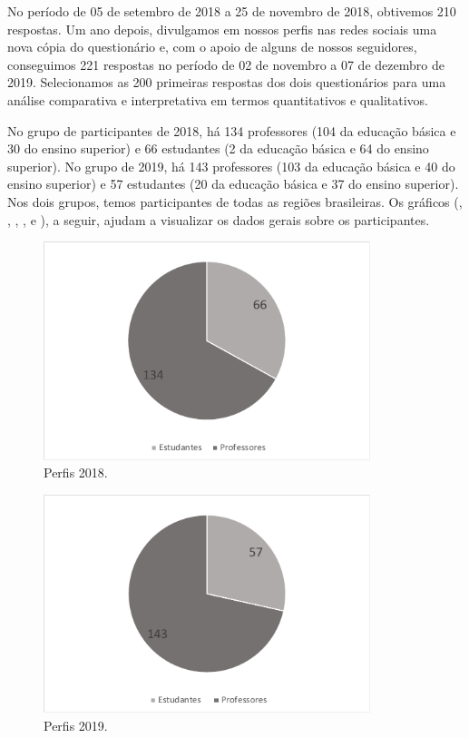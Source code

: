 \documentclass[portuguese]{textolivre}
\begin{document}
No período de 05 de setembro de 2018 a 25 de novembro de 2018, obtivemos 210 respostas. Um ano depois, divulgamos em nossos perfis nas redes sociais uma nova cópia do questionário e, com o apoio de alguns de nossos seguidores, conseguimos 221 respostas no período de 02 de novembro a 07 de dezembro de 2019. Selecionamos as 200 primeiras respostas dos dois questionários para uma análise comparativa e interpretativa em termos quantitativos e qualitativos.

No grupo de participantes de 2018, há 134 professores (104 da educação básica e 30 do ensino superior) e 66 estudantes (2 da educação básica e 64 do ensino superior). No grupo de 2019, há 143 professores (103 da educação básica e 40 do ensino superior) e 57 estudantes (20 da educação básica e 37 do ensino superior). Nos dois grupos, temos participantes de todas as regiões brasileiras. Os gráficos (, , , ,  e ), a seguir, ajudam a visualizar os dados gerais sobre os participantes.

\begin{figure}[htbp]
 \centering
 \includegraphics[width=0.85\textwidth]{Figura1.pdf}
 \caption{Perfis 2018.}
 \label{Fig1}
\end{figure}

\begin{figure}[htbp]
 \centering
 \includegraphics[width=0.85\textwidth]{Figura2.pdf}
 \caption{Perfis 2019.}
 \label{Fig2}
\end{figure}
\end{document}
